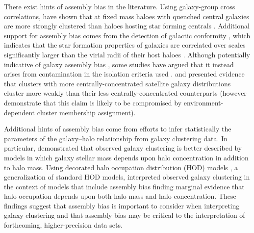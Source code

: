 \documentclass[usenatbib,fleqn]{mnras}
\begin{document}
There exist hints of assembly bias in the literature. Using galaxy-group cross correlations, \citet{Yang_etal06} have shown that at fixed mass haloes with quenched central galaxies are more strongly clustered than haloes hosting star forming centrals \citep[see also][]{blanton_berlind07, wang_etal08, wang_etal13}. Additional support for assembly bias comes from the detection of galactic conformity \citep{weinmann_etal06}, which indicates that the star formation properties of galaxies are correlated over scales significantly larger than the virial radii of their host haloes \citep{kauffmann_etal13,kawinwan_etal16,berti_etal17}. Although potentially indicative of galaxy assembly bias \citep[e.g.,][]{hearin_etal15,hearin_etal16}, some studies have argued that it instead arises from contamination in the isolation criteria used  \citep{tinker_etal17, sin_etal17}. \citet{miyatake_etal16} and \citet{more_etal16} presented  evidence that clusters with more centrally-concentrated 
satellite galaxy distributions cluster more weakly than  their less centrally-concentrated counterparts (however \citealt{zu_mandelbaum16} demonstrate that this claim is likely to be compromised by environment-dependent cluster membership assignment). 

Additional hints of assembly bias come from efforts to infer statistically the parameters of the galaxy--halo relationship from galaxy clustering data. In particular, \citet{lehmann_etal17} demonstrated that observed galaxy clustering is better described by models in which galaxy stellar mass depends upon halo concentration in addition to halo mass. Using decorated halo occupation distribution (HOD) models \citep{hearin_etal16}, a generalization of standard HOD models, \citet{zentner_etal16} interpreted observed galaxy clustering in the context of models that include assembly bias finding marginal evidence that halo occupation depends upon both halo mass and halo concentration. These findings suggest that assembly bias is important to consider when interpreting galaxy clustering and that assembly bias may be critical to the interpretation of forthcoming, higher-precision data sets.
\end{document}
